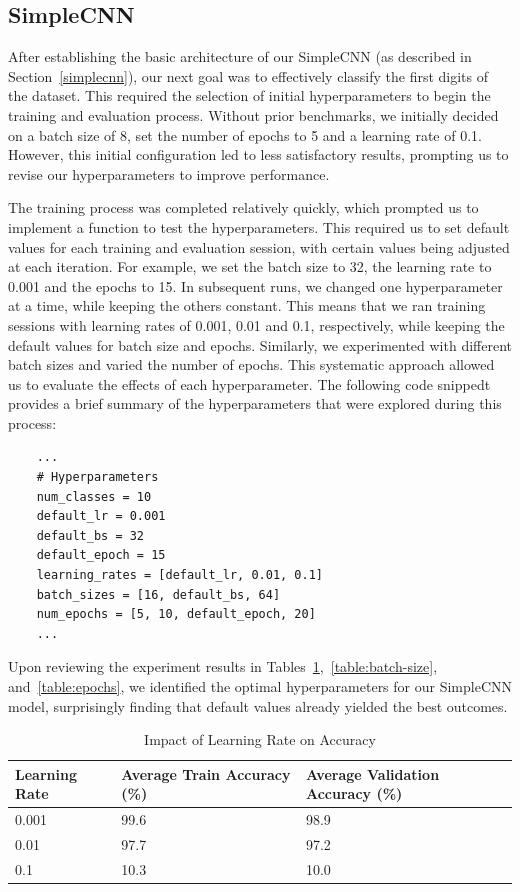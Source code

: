 \subsection{SimpleCNN}\label{resultsSimpleCNN}

After establishing the basic architecture of our SimpleCNN (as described in Section~\ref{simplecnn}), our next goal was to effectively classify the first digits of the dataset. This required the selection of initial hyperparameters to begin the training and evaluation process. Without prior benchmarks, we initially decided on a batch size of 8, set the number of epochs to 5 and a learning rate of 0.1. However, this initial configuration led to less satisfactory results, prompting us to revise our hyperparameters to improve performance.

The training process was completed relatively quickly, which prompted us to implement a function to test the hyperparameters. This required us to set default values for each training and evaluation session, with certain values being adjusted at each iteration. For example, we set the batch size to 32, the learning rate to 0.001 and the epochs to 15. In subsequent runs, we changed one hyperparameter at a time, while keeping the others constant. This means that we ran training sessions with learning rates of 0.001, 0.01 and 0.1, respectively, while keeping the default values for batch size and epochs. Similarly, we experimented with different batch sizes and varied the number of epochs. This systematic approach allowed us to evaluate the effects of each hyperparameter. The following code snippedt provides a brief summary of the hyperparameters that were explored during this process:

\begin{verbatim}
    ...
    # Hyperparameters
    num_classes = 10
    default_lr = 0.001
    default_bs = 32
    default_epoch = 15
    learning_rates = [default_lr, 0.01, 0.1]
    batch_sizes = [16, default_bs, 64]
    num_epochs = [5, 10, default_epoch, 20]
    ...
    \end{verbatim}

Upon reviewing the experiment results in Tables~\ref{table:lr},~\ref{table:batch-size}, and~\ref{table:epochs}, we identified the optimal hyperparameters for our SimpleCNN model, surprisingly finding that default values already yielded the best outcomes.

\begin{table}[ht]
\caption{Impact of Learning Rate on Accuracy}\label{table:lr}
\centering
\begin{tabular}{lll}
  \toprule
  Learning Rate & Average Train Accuracy (\%) & Average Validation Accuracy (\%) \\
  \midrule
  0.001 & 99.6 & 98.9 \\
  0.01  & 97.7 & 97.2 \\
  0.1   & 10.3 & 10.0 \\
  \bottomrule
\end{tabular}
\end{table}

